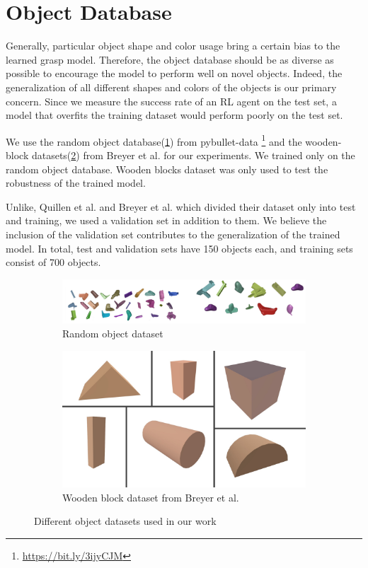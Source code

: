 \section{Object Database}

Generally, particular object shape and color usage bring a certain bias to the learned grasp model. Therefore, the object database should be as diverse as possible to encourage the model to perform well on novel objects. Indeed, the generalization of all different shapes and colors of the objects is our primary concern. Since we measure the success rate of an RL agent on the test set, a model that overfits the training dataset would perform poorly on the test set.

We use the random object database(\ref{fig:randomobj}) from pybullet-data \footnote{\url{https://bit.ly/3ijyCJM}} and the wooden-block datasets(\ref{fig:woodenobj}) from Breyer et al. for our experiments. We trained only on the random object database. Wooden blocks dataset was only used to test the robustness of the trained model.

Unlike, Quillen et al. and Breyer et al. which divided their dataset only into test and training, we used a validation set in addition to them.  We believe the inclusion of the validation set contributes to the generalization of the trained model. In total, test and validation sets have 150 objects each, and training sets consist of 700 objects.

\begin{figure}

    \begin{subfigure}{1.0\textwidth}
      \includegraphics[width=\linewidth]{figures/random_objects}
      \caption{Random object dataset} \label{fig:randomobj}
    \end{subfigure}%
    \hspace*{\fill}   %
    \newline
    \begin{subfigure}{1.0\textwidth}
      \centering
      \includegraphics[width=0.3\linewidth]{figures/wooden_blocks}
      \caption{Wooden block dataset from Breyer et al. \cite{Breyer2018}} \label{fig:woodenobj}
    \end{subfigure}%
    \hspace*{\fill}   %
\caption{ Different object datasets used in our work \label{fig:objdatasets}}
\end{figure}